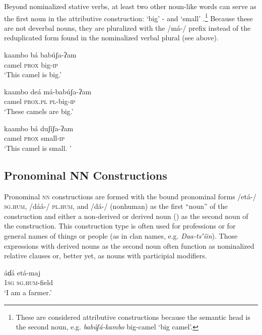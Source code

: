 \documentclass[output=paper]{langsci/langscibook}
\begin{document}
Beyond nominalized stative verbs, at least two other noun-like words can serve as the first noun in the attributive construction: ‘big’ - and ‘small’ .\footnote{These are considered attributive constructions because the semantic head is the second noun, e.g. \textit{bab\'{u}ʃá-kambo} big-camel ‘big camel’.} Because these are not deverbal nouns, they are pluralized with the /má-/ prefix  instead of the reduplicated form found in the nominalized verbal plural (see  above).

\ea\label{ex:ahlandc:52}
\gll
kaambo bá      bab\'{u}ʃa-ʔam  \\
camel    \textsc{prox}  big-\textsc{ip} \\
\glt
‘This camel is big.’
\z

\ea\label{ex:ahlandc:53}
\gll
kaambo deá          má-bab\'{u}ʃa-ʔam   \\
camel    \textsc{prox.pl}  \textsc{pl-}big\textsc{{}-ip} \\
\glt
‘These camels are big.’
\z

\ea\label{ex:ahlandc:54}
\gll
kaambo bá  duʃíʃa-ʔam  \\
camel    \textsc{prox}  small-\textsc{ip} \\
\glt
‘This camel is small. ’
\z

\subsection{Pronominal NN Constructions}\label{sec:ahlandc:8.3}

Pronominal \textsc{nn} constructions are formed with the bound pronominal forms /et\'{a}{}-/ \textsc{sg.hum}, /dáá-/ \textsc{pl.hum}, and /dá-/ (nonhuman) as the first “noun” of the construction and either a non-derived  or derived noun () as the second noun of the construction. This construction type is often used for professions  or for general names of things or people (as in clan names, e.g. \textit{Daa-ts}\textit{ʼíin}).   Those expressions with derived nouns as the second noun often function as nominalized relative clauses or, better yet, as nouns with participial modifiers. 

\ea\label{ex:ahlandc:55}
\ea\label{ex:ahlandc:55a}
\gll
áɗá  etá-maj   \\
  \textsc{1sg}  \textsc{sg.hum}{}-field\\
\glt
  ‘I am a farmer.’
\end{document}
